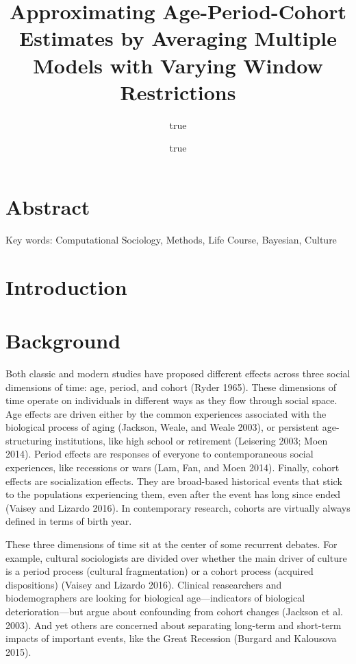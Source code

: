 \documentclass[]{article}
\title{Approximating Age-Period-Cohort Estimates by Averaging Multiple Models
with Varying Window Restrictions}
\author{true \and true}
\date{}
\begin{document}
\maketitle

\section{Abstract}\label{abstract}

Key words: Computational Sociology, Methods, Life Course, Bayesian,
Culture

\section{Introduction}\label{introduction}

\section{Background}\label{background}

Both classic and modern studies have proposed different effects across
three social dimensions of time: age, period, and cohort (Ryder 1965).
These dimensions of time operate on individuals in different ways as
they flow through social space. Age effects are driven either by the
common experiences associated with the biological process of aging
(Jackson, Weale, and Weale 2003), or persistent age-structuring
institutions, like high school or retirement (Leisering 2003; Moen
2014). Period effects are responses of everyone to contemporaneous
social experiences, like recessions or wars (Lam, Fan, and Moen 2014).
Finally, cohort effects are socialization effects. They are broad-based
historical events that stick to the populations experiencing them, even
after the event has long since ended (Vaisey and Lizardo 2016). In
contemporary research, cohorts are virtually always defined in terms of
birth year.

These three dimensions of time sit at the center of some recurrent
debates. For example, cultural sociologists are divided over whether the
main driver of culture is a period process (cultural fragmentation) or a
cohort process (acquired dispositions) (Vaisey and Lizardo 2016).
Clinical reasearchers and biodemographers are looking for biological
age---indicators of biological deterioration---but argue about
confounding from cohort changes (Jackson et al. 2003). And yet others
are concerned about separating long-term and short-term impacts of
important events, like the Great Recession (Burgard and Kalousova 2015).
\end{document}
